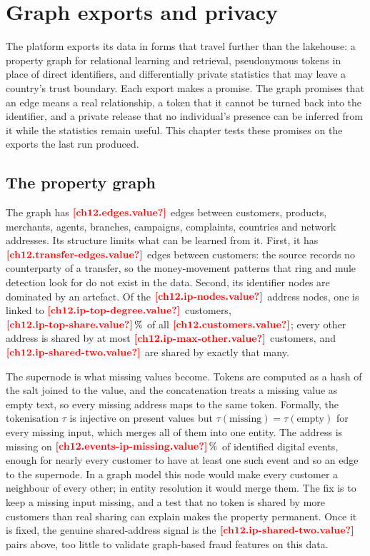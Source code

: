 \chapter{Graph exports and privacy}\label{ch:graph-and-privacy}

The platform exports its data in forms that travel further than the lakehouse: a property graph for relational learning
and retrieval, pseudonymous tokens in place of direct identifiers, and differentially private statistics that may leave a
country's trust boundary. Each export makes a promise. The graph promises that an edge means a real relationship, a token
that it cannot be turned back into the identifier, and a private release that no individual's presence can be inferred
from it while the statistics remain useful. This chapter tests these promises on the exports the last run produced.

\section{The property graph}\label{sec:gp-graph}

The graph has $\est{ch12.edges}{value}$ edges between customers, products, merchants, agents, branches, campaigns,
complaints, countries and network addresses. Its structure limits what can be learned from it. First, it has
$\est{ch12.transfer-edges}{value}$ edges between customers: the source records no counterparty of a transfer, so the
money-movement patterns that ring and mule detection look for do not exist in the data. Second, its identifier nodes are
dominated by an artefact. Of the $\est{ch12.ip-nodes}{value}$ address nodes, one is linked to
$\est{ch12.ip-top-degree}{value}$ customers, $\est{ch12.ip-top-share}{value}\,\%$ of all $\est{ch12.customers}{value}$; every
other address is shared by at most $\est{ch12.ip-max-other}{value}$ customers, and $\est{ch12.ip-shared-two}{value}$ are
shared by exactly that many.

The supernode is what missing values become. Tokens are computed as a hash of the salt joined to the value, and the
concatenation treats a missing value as empty text, so every missing address maps to the same token. Formally, the
tokenisation $\tau$ is injective on present values but $\tau(\text{missing}) = \tau(\text{empty})$ for every missing
input, which merges all of them into one entity. The address is missing on $\est{ch12.events-ip-missing}{value}\,\%$ of
identified digital events, enough for nearly every customer to have at least one such event and so an edge to the
supernode. In a graph model this node would make every customer a neighbour of every other; in entity resolution it would
merge them. The fix is to keep a missing input missing, and a test that no token is shared by more customers than real
sharing can explain makes the property permanent. Once it is fixed, the genuine shared-address signal is the
$\est{ch12.ip-shared-two}{value}$ pairs above, too little to validate graph-based fraud features on this data.

